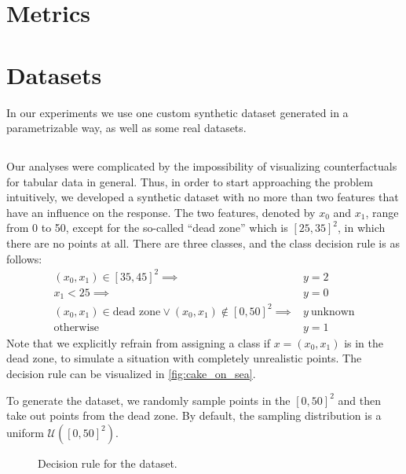 \documentclass[../main.tex]{subfiles}
\begin{document}
\section{Metrics}

\section{Datasets}

In our experiments we use one custom synthetic dataset generated in a parametrizable way, as well as some real datasets.

\subsection{}

Our analyses were complicated by the impossibility of visualizing counterfactuals for tabular data in general.
Thus, in order to start approaching the problem intuitively, we developed a synthetic dataset with no more than two features that have an influence on the response.
The two features, denoted by $x_0$ and $x_1$, range from 0 to 50, except for the so-called ``dead zone'' which is $[25, 35]^2$, in which there are no points at all.
There are three classes, and the class decision rule is as follows:
\begin{align*}
    (x_0, x_1) \in [35, 45]^2 \implies & y = 2 \\
    x_1 < 25                  \implies & y = 0 \\
    (x_0, x_1) \in \text{dead zone} \lor (x_0, x_1) \notin [0, 50]^2  \implies & y\ \text{unknown} \\
    \text{otherwise} \qquad            & y = 1
\end{align*}
Note that we explicitly refrain from assigning a class if $x = (x_0, x_1)$ is in the dead zone, to simulate a situation with completely unrealistic points.
The decision rule can be visualized in \autoref{fig:cake_on_sea}.

To generate the dataset, we randomly sample points in the $[0, 50]^2$ and then take out points from the dead zone. By default, the sampling distribution is a uniform $\mathcal{U}([0, 50]^2)$.

\begin{figure}[h]
    \centering
    
    \caption{Decision rule for the  dataset.}
    \label{fig:cake_on_sea}
\end{figure}
\end{document}
